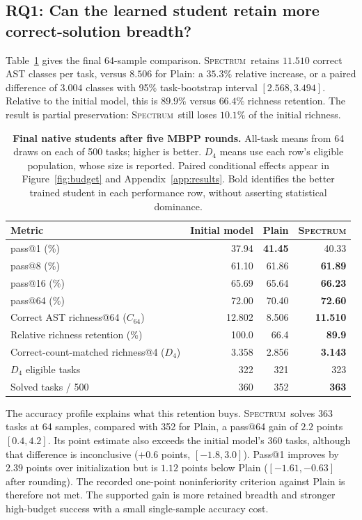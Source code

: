 \documentclass{article}
\newcommand{\method}{\textsc{Spectrum}}
\begin{document}
\subsection{RQ1: Can the learned student retain more correct-solution breadth?}
\label{sec:rq1}
Table~\ref{tab:main} gives the final 64-sample comparison. \method\ retains $11.510$ correct AST classes per task, versus $8.506$ for Plain: a $35.3\%$ relative increase, or a paired difference of $3.004$ classes with 95\% task-bootstrap interval $[2.568,3.494]$. Relative to the initial model, this is $89.9\%$ versus $66.4\%$ richness retention. The result is partial preservation: \method\ still loses $10.1\%$ of the initial richness.

\begin{table}[t]
\centering
\caption{\textbf{Final native students after five MBPP rounds.} All-task means from 64 draws on each of 500 tasks; higher is better. $D_4$ means use each row's eligible population, whose size is reported. Paired conditional effects appear in Figure~\ref{fig:budget} and Appendix~\ref{app:results}. Bold identifies the better trained student in each performance row, without asserting statistical dominance.}
\label{tab:main}
\begin{tabular}{lrrr}
\toprule
Metric & Initial model & Plain & \method\\
\midrule
pass@1 (\%) &37.94&\textbf{41.45}&40.33\\
pass@8 (\%) &61.10&61.86&\textbf{61.89}\\
pass@16 (\%) &65.69&65.64&\textbf{66.23}\\
pass@64 (\%) &72.00&70.40&\textbf{72.60}\\
Correct AST richness@64 ($C_{64}$) &12.802&8.506&\textbf{11.510}\\
Relative richness retention (\%) &100.0&66.4&\textbf{89.9}\\
Correct-count-matched richness@4 ($D_4$) &3.358&2.856&\textbf{3.143}\\
$D_4$ eligible tasks &322&321&323\\
Solved tasks / 500 &360&352&\textbf{363}\\
\bottomrule
\end{tabular}
\end{table}

The accuracy profile explains what this retention buys. \method\ solves 363 tasks at 64 samples, compared with 352 for Plain, a pass@64 gain of $2.2$ points $[0.4,4.2]$. Its point estimate also exceeds the initial model's 360 tasks, although that difference is inconclusive ($+0.6$ points, $[-1.8,3.0]$). Pass@1 improves by $2.39$ points over initialization but is $1.12$ points below Plain ($[-1.61,-0.63]$ after rounding). The recorded one-point noninferiority criterion against Plain is therefore not met. The supported gain is more retained breadth and stronger high-budget success with a small single-sample accuracy cost.
\end{document}
